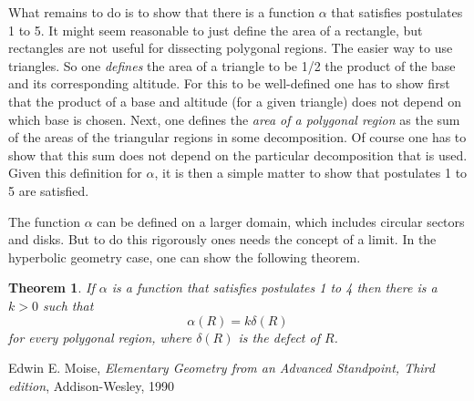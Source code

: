 \documentclass[12pt]{article}
\newtheorem{thm}{Theorem}
\begin{document}
What remains to do is to show that there is a function $\alpha$ that satisfies postulates
1 to 5. 
It might seem reasonable to just define the area of a rectangle, but rectangles are not 
useful for dissecting polygonal regions. The easier way to use triangles.
So one \emph{defines} the area of a triangle to be 
1/2 the product of the base and its corresponding altitude. For this to be well-defined
one has to show first that the product of a base and altitude (for a given triangle)
does not depend on which base is chosen.  Next, one defines the \emph{area of a polygonal region}
as the sum of the areas of the triangular regions in some decomposition. Of course one has to 
show that this sum does not depend on  the particular decomposition that is used.
Given this definition for $\alpha$, it is then a simple matter to show that
postulates 1 to 5 are satisfied.

The function $\alpha$ can be defined on a larger domain, which includes circular sectors and disks.
But to do this rigorously ones needs the concept of a limit.
In the hyperbolic geometry case, one can show the following theorem.

\begin{thm}
If $\alpha$ is a function that satisfies postulates 1 to 4 then there is a $k>0$ such
that 
$$
\alpha(R) = k \delta(R)
$$
for every polygonal region, where $\delta(R)$ is the defect of $R$.
\end{thm}


\begin{thebibliography}{99}
 Edwin E. Moise, \emph{Elementary Geometry from an Advanced Standpoint, Third edition}, 
Addison-Wesley, 1990
\end{thebibliography}






\end{document}
